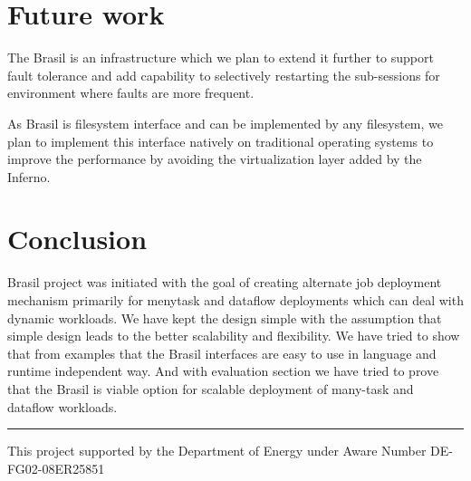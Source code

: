 \documentclass[conference]{sig-alternate}
\begin{document}
\section{Future work}
The Brasil is an infrastructure which we plan to extend it further to support
fault tolerance and add capability to selectively restarting the sub-sessions
for environment where faults are more frequent.

As Brasil is filesystem interface and can be implemented by any filesystem, we
plan to implement this interface natively on traditional operating systems to
improve the performance by avoiding the virtualization layer added by the
Inferno.

\section{Conclusion}
Brasil project was initiated with the goal of creating alternate job deployment
mechanism primarily for menytask and dataflow deployments which can deal with
dynamic workloads. We have kept the design simple with the assumption that
simple design leads to the better scalability and flexibility.  We have tried
to show that from examples that the Brasil interfaces are easy to use in
language and runtime independent way. And with evaluation section we have
tried to prove that the Brasil is viable option for scalable deployment of
many-task and dataflow workloads.
\newline
\newline

\hrule
This project supported by the Department of Energy under Aware Number 
DE- FG02-08ER25851

\end{document}
